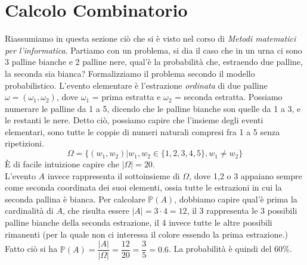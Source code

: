 \documentclass[12pt, letterpaper]{article}
\begin{document}
\section{Calcolo Combinatorio}
Riassumiamo in questa sezione ciò che si è visto nel corso di \textit{Metodi matematici per l'informatica}. Partiamo
con un problema, si dia il caso che in un urna ci sono 3 palline bianche e 2 palline nere, qual'è la probabilità che, 
estraendo due palline, la seconda sia bianca? Formalizziamo il problema secondo il modello probabilistico.
L'evento elementare è l'estrazione \textit{ordinata} di due palline \(\omega=(\omega_1,\omega_2)\), dove 
\(\omega_1\) = prima estratta e \(\omega_2\) = seconda estratta. Possiamo numerare le palline da 1 a 5, 
dicendo che le palline bianche son quelle da 1 a 3, e le restanti le nere. Detto ciò, possiamo capire che l'insieme 
degli eventi elementari, sono tutte le coppie di numeri naturali compresi fra 1 a 5 senza ripetizioni.
\begin{equation}
    \Omega = \{(w_1,w_2) | w_1,w_2 \in \{1,2,3,4,5\}, w_1 \ne w_2\}
\end{equation}
È di facile intuizione capire che \(|\Omega|=20\).\\
L'evento \(A\) invece rappresenta il sottoinsieme di \(\Omega\), dove 1,2 o 3 appaiano sempre come seconda 
coordinata dei suoi elementi, ossia tutte le estrazioni in cui la seconda pallina è bianca. Per calcolare \(\mathbb{P}(A)\),
dobbiamo capire qual'è prima la cardinalità di \(A\), che risulta essere \(|A|=3\cdot 4 = 12\), il 3 rappresenta 
le 3 possibili palline bianche della seconda estrazione, il 4 invece tutte le altre possibili rimanenti (per
 la quale non ci interessa il colore essendo la prima estrazione.) Fatto ciò si ha \(\mathbb{P}(A)=\dfrac{|A|}{|\Omega|}=\dfrac{12}{20}=\dfrac{3}{5}=0.6\). La 
 probabilità è quindi del 60\%.
\end{document}
